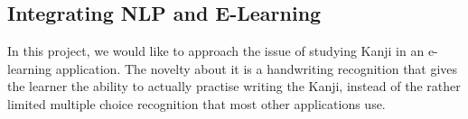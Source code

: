 
\subsection{Integrating NLP and E-Learning}
In this project, we would like to approach the issue of studying Kanji in an e-learning application. The novelty about it is a handwriting recognition that gives the learner the ability to actually practise writing the Kanji, instead of the rather limited multiple choice recognition that most other applications use.

